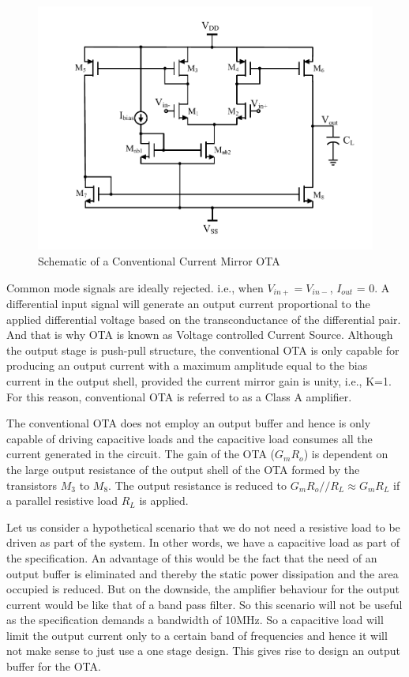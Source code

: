 \begin{figure} [H]
\centering
\includegraphics[scale=1]{Figures/Schematics/OTA_NMOS.pdf}
\caption{Schematic of a Conventional Current Mirror OTA}
\label{fig:OTA_Schematic_Ibias}
\end{figure}

Common mode signals are ideally rejected. i.e., when $V_{in+} = V_{in-}$, $I_{out}$ = 0. A differential input signal will generate an output current proportional to the applied differential voltage based on the transconductance of the differential pair. And that is why OTA is known as Voltage controlled Current Source. Although the output stage is push-pull structure, the conventional OTA is only capable for producing an output current with a maximum amplitude equal to the bias current in the output shell, provided the current mirror gain is unity, i.e., K=1. For this reason, conventional OTA is referred to as a Class A amplifier. 

The conventional OTA does not employ an output buffer and hence is only capable of driving capacitive loads and the capacitive load consumes all the current generated in the circuit. The gain of the OTA ($G_mR_o$) is dependent on the large output resistance of the output shell of the OTA formed by the transistors $M_3$ to $M_8$. The output resistance is reduced to $G_mR_o//R_L \approx G_mR_L$ if a parallel resistive load $R_L$ is applied.

Let us consider a hypothetical scenario that we do not need a resistive load to be driven as part of the system. In other words, we have a capacitive load as part of the specification. An advantage of this would be the fact that the need of an output buffer is eliminated and thereby the static power dissipation and the area occupied is reduced. But on the downside, the  amplifier behaviour for the output current would be like that of a band pass filter. So this scenario will not be useful as the specification demands a bandwidth of 10MHz. So a capacitive load will limit the output current only to a certain band of frequencies and hence it will not make sense to just use a one stage design. This gives rise to design an output buffer for the OTA.

